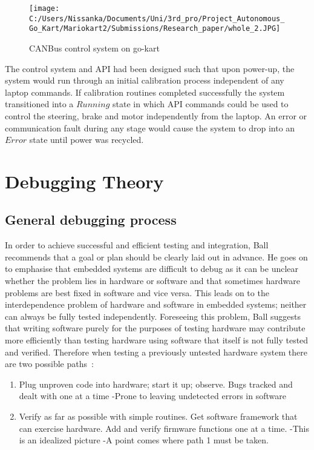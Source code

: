 \documentclass{ENZCon}
\begin{document}
\begin{figure}[htbp]
	\centering
		\texttt{[image: C:/Users/Nissanka/Documents/Uni/3rd\_pro/Project\_Autonomous\_Go\_Kart/Mariokart2/Submissions/Research\_paper/whole\_2.JPG]}
	\caption{CANBus control system on go-kart}
	\label{fig:whole}
\end{figure}

The control system and API had been designed such that upon power-up, the system would run through an initial calibration process independent of any laptop commands. If calibration routines completed successfully the system transitioned into a $Running$ state in which API commands could be used to control the steering, brake and motor independently from the laptop. An error or communication fault during any stage would cause the system to drop into an $Error$ state until power was recycled. 

\section{Debugging Theory}

\subsection{General debugging process}

In order to achieve successful and efficient testing and integration, Ball~\cite{ball_2002} recommends that a goal or plan should be clearly laid out in advance. He goes on to emphasise that embedded systems are difficult to debug as it can be unclear whether the problem lies in hardware or software and that sometimes hardware problems are best fixed in software and vice versa. This leads on to the interdependence problem of hardware and software in embedded systems; neither can always be fully tested independently. Foreseeing this problem, Ball suggests that writing software purely for the purposes of testing hardware may contribute more efficiently than testing hardware using software that itself is not fully tested and verified. Therefore when testing a previously untested hardware system there are two possible paths~\cite{ball_1998_debugging}:
\begin{enumerate}
	\item{Plug unproven code into hardware; start it up; observe.
Bugs tracked and dealt with one at a time
-Prone to leaving undetected errors in software}
	\item{Verify as far as possible with simple routines.
Get software framework that can exercise hardware.
Add and verify firmware functions one at a time.
-This is an idealized picture
-A point comes where path 1 must be taken.}
\end{enumerate}
\end{document}
